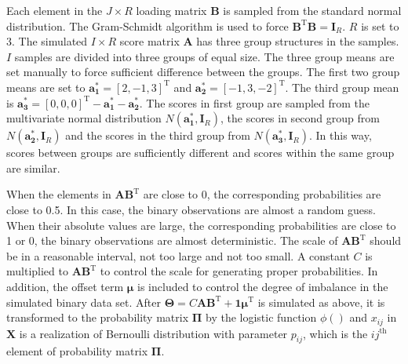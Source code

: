 Each element in the $J \times R$ loading matrix $\mathbf{B}$ is sampled from the standard normal distribution. The Gram-Schmidt algorithm is used to force $\mathbf{B}^{\text{T}}\mathbf{B}=\mathbf{I}_R$. $R$ is set to 3. The simulated $I \times R$ score matrix $\mathbf{A}$ has three group structures in the samples. $I$ samples are divided into three groups of equal size. The three group means are set manually to force sufficient difference between the groups. The first two group means are set to $\mathbf{a_1^*} = [2,-1,3]^{\text{T}}$ and $\mathbf{a_2^*} = [-1,3,-2]^{\text{T}}$. The third group mean is $\mathbf{a_3^*} = [0,0,0]^{\text{T}} - \mathbf{a_1^*} - \mathbf{a_2^*}$. The scores in first group are sampled from the multivariate normal distribution $N(\mathbf{a_1^*}, \mathbf{I}_R)$, the scores in second group from $N(\mathbf{a_2^*},\mathbf{I}_R)$ and the scores in the third group from $N(\mathbf{a_3^*}, \mathbf{I}_R)$. In this way, scores between groups are sufficiently different and scores within the same group are similar.

When the elements in $\mathbf{A}\mathbf{B}^{\text{T}}$ are close to $0$, the corresponding probabilities are close to 0.5. In this case, the binary observations are almost a random guess. When their absolute values are large, the corresponding probabilities are close to 1 or 0, the binary observations are almost deterministic. The scale of $\mathbf{A}\mathbf{B}^{\text{T}}$ should be in a reasonable interval, not too large and not too small. A constant $C$ is multiplied to $\mathbf{A}\mathbf{B}^{\text{T}}$ to control the scale for generating proper probabilities. In addition, the offset term $\bm{\mu}$ is included to control the degree of imbalance in the simulated binary data set. After $\mathbf{\Theta} = C\mathbf{A}\mathbf{B}^{\text{T}} + \mathbf{1}\bm{\mu}^{\text{T}}$ is simulated as above, it is transformed to the probability matrix $\mathbf{\Pi}$ by the logistic function $\phi()$ and $x_{ij}$ in $\mathbf{X}$ is a realization of Bernoulli distribution with parameter $p_{ij}$, which is the $ij^{\text{th}}$ element of probability matrix $\mathbf{\Pi}$.

